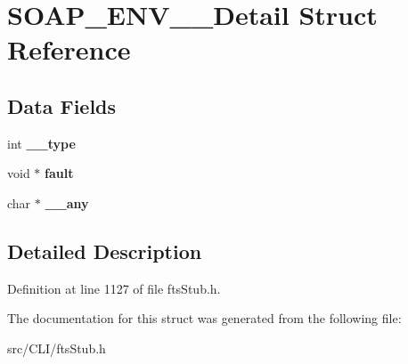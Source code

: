 \section{SOAP\_\-ENV\_\-\_\-Detail Struct Reference}
\label{structSOAP__ENV____Detail}
\subsection*{Data Fields}
\begin{DoxyCompactItemize}
\item 
int {\bfseries \_\-\_\-type}\label{structSOAP__ENV____Detail_ae21be5af0f3f6dc47f2dbf4e35e22300}

\item 
void $\ast$ {\bfseries fault}\label{structSOAP__ENV____Detail_a159d344759c06f82eae1949aea10a1cf}

\item 
char $\ast$ {\bfseries \_\-\_\-any}\label{structSOAP__ENV____Detail_aec8be27bbc4e83f9f8d7ea97c034f822}

\end{DoxyCompactItemize}


\subsection{Detailed Description}


Definition at line 1127 of file ftsStub.h.



The documentation for this struct was generated from the following file:\begin{DoxyCompactItemize}
\item 
src/CLI/ftsStub.h\end{DoxyCompactItemize}
